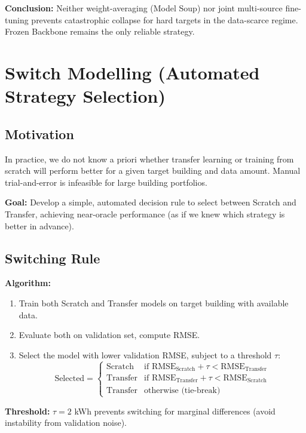 \documentclass[12pt,a4paper]{report}
\begin{document}
\textbf{Conclusion:} Neither weight-averaging (Model Soup) nor joint multi-source fine-tuning prevents catastrophic collapse for hard targets in the data-scarce regime. Frozen Backbone remains the only reliable strategy.

\section{Switch Modelling (Automated Strategy Selection)}

\subsection{Motivation}

In practice, we do not know a priori whether transfer learning or training from scratch will perform better for a given target building and data amount. Manual trial-and-error is infeasible for large building portfolios.

\textbf{Goal:} Develop a simple, automated decision rule to select between Scratch and Transfer, achieving near-oracle performance (as if we knew which strategy is better in advance).

\subsection{Switching Rule}

\textbf{Algorithm:}
\begin{enumerate}
    \item Train both Scratch and Transfer models on target building with available data.
    \item Evaluate both on validation set, compute RMSE.
    \item Select the model with lower validation RMSE, subject to a threshold \(\tau\):
    \[
    \text{Selected} = 
    \begin{cases}
    \text{Scratch} & \text{if } \text{RMSE}_{\text{Scratch}} + \tau < \text{RMSE}_{\text{Transfer}} \\
    \text{Transfer} & \text{if } \text{RMSE}_{\text{Transfer}} + \tau < \text{RMSE}_{\text{Scratch}} \\
    \text{Transfer} & \text{otherwise (tie-break)}
    \end{cases}
    \]
\end{enumerate}

\textbf{Threshold:} \(\tau = 2\) kWh prevents switching for marginal differences (avoid instability from validation noise).
\end{document}
